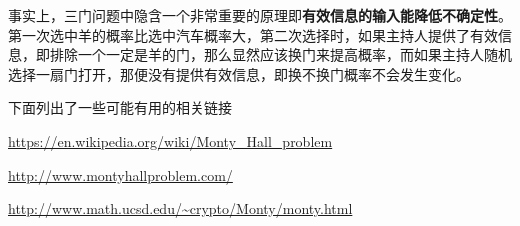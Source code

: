 事实上，三门问题中隐含一个非常重要的原理即\textbf{有效信息的输入能降低不确定性}。第一次选中羊的概率比选中汽车概率大，第二次选择时，如果主持人提供了有效信息，即排除一个一定是羊的门，那么显然应该换门来提高概率，而如果主持人随机选择一扇门打开，那便没有提供有效信息，即换不换门概率不会发生变化。

下面列出了一些可能有用的相关链接

\url{https://en.wikipedia.org/wiki/Monty_Hall_problem}

\url{http://www.montyhallproblem.com/}

\url{http://www.math.ucsd.edu/~crypto/Monty/monty.html}